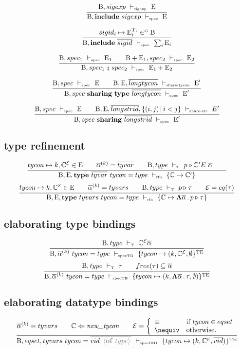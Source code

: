 \documentclass[11pt,a4paper]{article}
\newcommand{\key}[1]{\textrm{\textbf{#1}}}
\newcommand{\type}      {\key{type}}
\newcommand{\inc}       {\key{include}}
\newcommand{\sharing}   {\key{sharing}}
\newcommand{\B}  {\textrm{B}}
\newcommand{\E}  {\textrm{E}}
\newcommand{\T}  {\textrm{T}}
\newcommand{\TE} {\textrm{TE}}
\newcommand{\sG} {\textrm{\tiny G}}
\newcommand{\tycon}{\mathbb{C}}
\newcommand{\equality}{\mathcal{E}}
\newcommand{\eqyes}{\equiv}
\newcommand{\eqnot}{\nequiv}
\newcommand{\corenew}[1]{\textit{new\_#1}}
\newcommand{\vdashSigexp}  {\ \vdash_{\textrm{\tiny sigexp}}\ }
\newcommand{\vdashSpec}    {\ \vdash_{\textrm{\tiny spec}}\ }
\newcommand{\vdashSpecTB}  {\ \vdash_{\textrm{\tiny specTB}}\ }
\newcommand{\vdashSpecDBA} {\ \vdash_{\textrm{\tiny specDB1}}\ }
\newcommand{\vdashTyperfn} {\ \vdash_{\textrm{\tiny rfn}}\ }
\newcommand{\vdashShareTycon}{\ \vdash_{\textrm{\tiny share-tycon}}\ }
\newcommand{\vdashShareStr}	{\ \vdash_{\textrm{\tiny share-str}}\ }
\newcommand{\vdashT}       {\ \vdash_{\textrm{\tiny T}}\ }
\newcommand{\braced}[1]{\{#1\}}
\newcommand{\angled}[1]{\,{\color{gray}\langle#1\rangle}\,}
\newcommand{\qualtype}[2]{#1 \triangleright #2}
\newcommand{\tyfun}[2]{\mathbf{\Lambda} #1\,.\,#2}
\begin{document}
\[
\cfrac
 {\B, sigexp \vdashSigexp \E}
 {\B, \inc\ sigexp \vdashSpec \E}
\]

\[
\cfrac
 {sigid_i \mapsto \E_i^{\T_i} \in^\sG \B}
 {\B, \inc\ \overline{sigid} \vdashSpec \sum_i \E_i}
\]

\[
\cfrac
 {\B,      spec_1 \vdashSpec \E_1 \qquad
  \B+\E_1, spec_2 \vdashSpec \E_2}
 {\B, spec_1\ \key{;}\ spec_2 \vdashSpec \E_1 + \E_2}
\]

\[
\cfrac
 { \B, spec \vdashSpec \E \qquad
   \B, \E, \overline{longtycon} \vdashShareTycon \E' }
 {\B, spec\ \sharing\ \type\ \overline{longtycon} \vdashSpec \E'}
\]

\[
\cfrac
 {\B, spec \vdashSpec \E \qquad
  \B, \E, \overline{longstrid},\braced{(i,j)\,|\,i<j}\vdashShareStr E'}
 {\B, spec\ \sharing\ \overline{longstrid} \vdashSpec \E'}
\]

\subsection {type refinement}
\[
\cfrac
 {tycon \mapsto k, \tycon^\equality \in \E                  \qquad
  \overline{\alpha}^{(k)} = \overline{tyvar}                \qquad
  \B, type \vdashT \qualtype{p}{\tycon'^\equality\ \overline{\alpha}} \qquad
  }
 {\B, \E, \type\ \overline{tyvar}\ tycon = type \vdashTyperfn \braced{\tycon \mapsto \tycon'}}
\]
\[
\cfrac
 {tycon \mapsto k, \tycon^\equality \in \E                  \qquad
  \overline{\alpha}^{(k)} = tyvars                          \qquad
  \B, type \vdashT \qualtype{p}{\tau}                       \qquad
  \equality = eq(\tau)
  }
 {\B, \E, \type\ tyvars\ tycon = type \vdashTyperfn
    \braced{\tycon \mapsto \tyfun{\overline{\alpha}}{\qualtype{p}{\tau}}}}
\]

\subsection {elaborating type bindings}
\[
\cfrac
 {\B, type \vdashT \tycon^\equality \overline\alpha }
 {\B,\overline{\alpha}^{(k)}\ tycon = type \vdashSpecTB \braced{tycon \mapsto (k, \tycon^\equality,\emptyset}^\TE}
\]
\[
\cfrac
 {\B, type \vdashT \tau \qquad free(\tau) \subseteq \overline\alpha}
 {\B,\overline{\alpha}^{(k)}\ tycon = type \vdashSpecTB 
     \braced{tycon \mapsto (k, \tyfun{\overline\alpha}{\tau},\emptyset)}^\TE}
\]
\subsection {elaborating datatype bindings}
\[
\cfrac
 {\overline{\alpha}^{(k)} = tyvars      \qquad
  \tycon \Leftarrow \corenew{tycon} 	\qquad
  \equality = \left\{\begin{array}{ll}
  			  \eqyes	& \textrm{if } tycon \in eqset  	\\
			  \eqnot	& \textrm{otherwise.}				\\
  			  \end{array}\right.
 }
 {\B,eqset,tyvars\ tycon = \overline{vid\ \angled{\key{of}\ type}} \vdashSpecDBA
    \braced{tycon \mapsto (k, \tycon^\equality,\overline{vid})}^\TE }
\]
\end{document}
